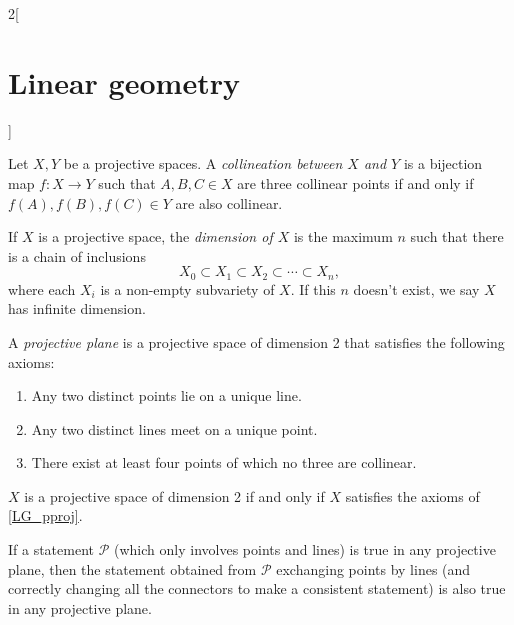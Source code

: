 \documentclass[../../../main.tex]{subfiles}
\begin{document}
\begin{multicols}{2}[\section{Linear geometry}]
\begin{prop}
  \end{prop}
  \begin{definition}
    Let $X,Y$ be a projective spaces. A \textit{collineation between $X$ and $Y$} is a bijection map $f:X\rightarrow Y$ such that $A,B,C\in X$ are three collinear points if and only if $f(A),f(B),f(C)\in Y$ are also collinear.
  \end{definition}
  \begin{definition}
    If $X$ is a projective space, the \textit{dimension of $X$} is the maximum $n$ such that there is a chain of inclusions $$X_0\subset X_1\subset X_2 \subset\cdots\subset X_n,$$ where each $X_i$ is a non-empty subvariety of $X$. If this $n$ doesn't exist, we say $X$ has infinite dimension.
  \end{definition}
  \begin{definition}\label{LG_pproj}
    A \textit{projective plane} is a projective space of dimension 2 that satisfies the following axioms:
    \begin{enumerate}
      \item Any two distinct points lie on a unique line.
      \item Any two distinct lines meet on a unique point.
      \item There exist at least four points of which no three are collinear.
    \end{enumerate}
  \end{definition}
  \begin{theorem}
    $X$ is a projective space of dimension 2 if and only if $X$ satisfies the axioms of \cref{LG_pproj}.
  \end{theorem}
  \begin{theorem}
    If a statement $\mathcal{P}$ (which only involves points and lines) is true in any projective plane, then the statement obtained from $\mathcal{P}$ exchanging points by lines (and correctly changing all the connectors to make a consistent statement) is also true in any projective plane.
  \end{theorem}

\end{multicols}
\end{document}
